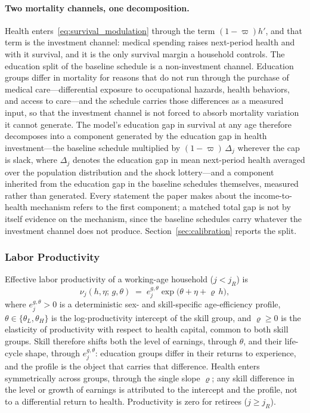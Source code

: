 \documentclass[12pt,a4paper]{article}
\begin{document}
\paragraph{Two mortality channels, one decomposition.}
Health enters~\eqref{eq:survival_modulation} through the term $(1-\varpi)h'$, and that term is the investment channel: medical spending raises next-period health and with it survival, and it is the only survival margin a household controls. The education split of the baseline schedule is a non-investment channel. Education groups differ in mortality for reasons that do not run through the purchase of medical care---differential exposure to occupational hazards, health behaviors, and access to care---and the schedule carries those differences as a measured input, so that the investment channel is not forced to absorb mortality variation it cannot generate. The model's education gap in survival at any age therefore decomposes into a component generated by the education gap in health investment---the baseline schedule multiplied by $(1-\varpi)\,\Delta_j$ wherever the cap is slack, where $\Delta_j$ denotes the education gap in mean next-period health averaged over the population distribution and the shock lottery---and a component inherited from the education gap in the baseline schedules themselves, measured rather than generated. Every statement the paper makes about the income-to-health mechanism refers to the first component; a matched total gap is not by itself evidence on the mechanism, since the baseline schedules carry whatever the investment channel does not produce. Section~\ref{sec:calibration} reports the split.

\subsubsection{Labor Productivity}
\label{subsubsec:productivity}

Effective labor productivity of a working-age household ($j < j_R$) is
\begin{equation}
\label{eq:labor_productivity}
\nu_j(h, \eta;\, g,\theta) \;=\; e_{j}^{g,\theta} \exp\bigl(\theta + \eta + \varrho\, h\bigr),
\end{equation}
where $e_{j}^{g,\theta} > 0$ is a deterministic sex- and skill-specific age-efficiency profile, $\theta \in \{\theta_L, \theta_H\}$ is the log-productivity intercept of the skill group, and $\varrho \geq 0$ is the elasticity of productivity with respect to health capital, common to both skill groups. Skill therefore shifts both the level of earnings, through $\theta$, and their life-cycle shape, through $e^{g,\theta}_j$: education groups differ in their returns to experience, and the profile is the object that carries that difference. Health enters symmetrically across groups, through the single slope $\varrho$; any skill difference in the level or growth of earnings is attributed to the intercept and the profile, not to a differential return to health. Productivity is zero for retirees ($j \geq j_R$).
\end{document}

